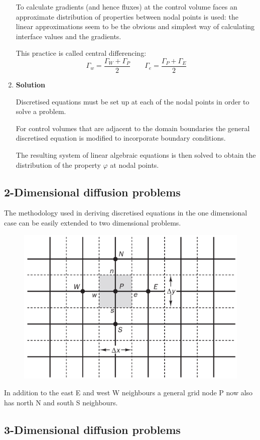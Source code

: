 \documentclass[a4paper, 15pt]{article}
\begin{document}
\begin{enumerate}
		To
		calculate gradients (and hence fluxes) at the control volume faces an approximate distribution
		of properties between nodal points is used: the linear approximations seem to be the obvious and
		simplest way of calculating interface values and the gradients. 
		
		This
		practice is called central differencing:
		\[\Gamma_w = \dfrac{\Gamma_W+\Gamma_P}{2} \qquad \Gamma_e = \dfrac{\Gamma_P+\Gamma_E}{2}\]
		
		\item \textbf{Solution}
		
		Discretised
		equations must be set up at each of the nodal points in order to solve a problem. \newline 
		
		For
		control volumes that are adjacent to the domain boundaries the general discretised equation
		is modified to incorporate boundary conditions. \newline 
		
		The
		resulting system of linear algebraic equations is then solved to obtain the distribution of the
		property $\varphi$ at nodal points.
	\end{enumerate}

\subsection*{2-Dimensional diffusion problems}

	The
	methodology used in deriving discretised equations in the one dimensional case can be
	easily extended to two dimensional problems. 
	\begin{figure}[H]
		\centering
		\includegraphics[width=0.4\linewidth]{fig/screenshot008}
		\label{fig:screenshot008}
	\end{figure}
	In addition to
	the east E and west W neighbours a general grid node P now also has north N and south S
	neighbours.

\subsection*{3-Dimensional diffusion problems}
\end{document}
